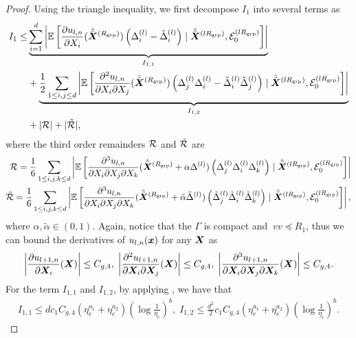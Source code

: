 \begin{proof}
    Using the triangle inequality, we first decompose $I_1$ into several terms as
    \begin{align*}
        I_1 \le &\underbrace{\sum_{i=1}^d \left|\mathbb{E}\left[\frac{\partial u_{l,n}}{\partial X_i}(\hat{\bar{{\bm{X}}}}^{(R_{\mathrm{grp}})})\left(\Delta_i^{(l)}-\tilde\Delta_i^{(l)}\right)\mid \hat{\bar{{\bm{X}}}}^{(lR_{\mathrm{grp}})},\mathcal{E}_0^{(lR_{\mathrm{grp}})}\right]\right|}_{I_{1,1}}\\
        &+\underbrace{\frac{1}{2}\sum_{1 \le i,j\le d} \left|\mathbb{E}\left[\frac{\partial^2 u_{l,n}}{\partial X_i\partial X_j}(\hat{\bar{{\bm{X}}}}^{(R_{\mathrm{grp}})})\left(\Delta_j^{(l)}\Delta_i^{(l)}-\tilde\Delta_i^{(l)}\tilde\Delta_j^{(l)}\right)\mid \hat{\bar{{\bm{X}}}}^{(lR_{\mathrm{grp}})},\mathcal{E}_0^{(lR_{\mathrm{grp}})}\right]\right|}_{I_{1,2}}\\
        &+|\mathcal{R}| + |\tilde{\mathcal{R}}|,
    \end{align*}
    where the third order remainders $\mathcal{R}$ and $\tilde{\mathcal{R}}$ are 
    \begin{align*}
        \mathcal{R} = \frac{1}{6}\sum_{1 \le i,j,k\le d} \left|\mathbb{E}\left[\frac{\partial^3 u_{l,n}}{\partial X_i\partial X_j\partial X_k}(\hat{\bar{{\bm{X}}}}^{(R_{\mathrm{grp}})} + \alpha\Delta^{(l)})\left(\Delta_j^{(l)}\Delta_i^{(l)}\Delta_k^{(l)}\right)\mid \hat{\bar{{\bm{X}}}}^{(lR_{\mathrm{grp}})},\mathcal{E}_0^{(lR_{\mathrm{grp}})}\right]\right|\\
        \tilde{\mathcal{R}} = \frac{1}{6}\sum_{1 \le i,j,k\le d} \left|\mathbb{E}\left[\frac{\partial^3 u_{l,n}}{\partial X_i\partial X_j\partial X_k}(\hat{\bar{{\bm{X}}}}^{(R_{\mathrm{grp}})}+ \tilde\alpha\tilde\Delta^{(l)})\left(\tilde\Delta_j^{(l)}\tilde\Delta_i^{(l)}\tilde\Delta_k^{(l)}\right)\mid \hat{\bar{{\bm{X}}}}^{(lR_{\mathrm{grp}})},\mathcal{E}_0^{(lR_{\mathrm{grp}})}\right]\right|,
    \end{align*}
    where $\alpha,\tilde\alpha\in(0,1)$. Again, notice that the $\Gamma$ is compact and $\ vv\preceq R_1$, thus we can bound the derivatives of $u_{l,n}({\bm{x}})$ for any ${\bm{X}}$ as
    \begin{align}
        \left|\frac{\partial u_{l+1,n}}{\partial {\bm{X}}_i}({\bm{X}})\right| \le C_{g,4},\;\left|\frac{\partial^2 u_{l+1,n}}{\partial {\bm{X}}_i\partial {\bm{X}}_j}({\bm{X}})\right| \le C_{g,4},\;\left|\frac{\partial^3 u_{l+1,n}}{\partial {\bm{X}}_i\partial {\bm{X}}_j\partial {\bm{X}}_k}({\bm{X}})\right| \le C_{g,4}. \label{equ:derivative-bound}
    \end{align}
    For the term $I_{1,1}$ and $I_{1,2}$, by applying , we have that
    \begin{align*}
        I_{1,1} \le d c_1 C_{g,4}(\eta_e^{a_1} + \eta_e^{a_2})(\log\frac{1}{\eta_e})^b,\;I_{1,2} \le \frac{d^2}{2} c_1 C_{g,4}(\eta_e^{a_1} + \eta_e^{a_2})(\log\frac{1}{\eta_e})^b.

\end{align*}
\end{proof}

